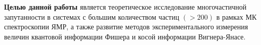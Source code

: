 \textbf{Целью данной работы} является теоретическое исследование многочастичной запутанности в системах с большим количеством частиц $(>200)$ в рамках МК спектроскопии ЯМР,
а также развитие методов экспериментального измерения величин квантовой информации Фишера и косой информации Вигнера-Янасе.